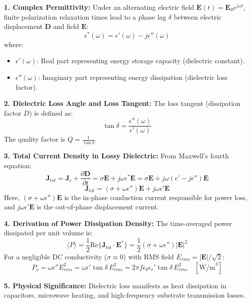 \begin{theorysol}
\textbf{1. Complex Permittivity:}
Under an alternating electric field $\mathbf{E}(t) = \mathbf{E}_0 e^{j\omega t}$, finite polarization relaxation times lead to a phase lag $\delta$ between electric displacement $\mathbf{D}$ and field $\mathbf{E}$:
\begin{equation}
\epsilon^*(\omega) = \epsilon'(\omega) - j\epsilon''(\omega)
\end{equation}
where:
\begin{itemize}
\item $\epsilon'(\omega)$: Real part representing energy storage capacity (dielectric constant).
\item $\epsilon''(\omega)$: Imaginary part representing energy dissipation (dielectric loss factor).
\end{itemize}

\textbf{2. Dielectric Loss Angle and Loss Tangent:}
The loss tangent (dissipation factor $D$) is defined as:
\begin{equation}
\tan \delta = \frac{\epsilon''(\omega)}{\epsilon'(\omega)}
\end{equation}
The quality factor is $Q = \frac{1}{\tan \delta}$.

\textbf{3. Total Current Density in Lossy Dielectric:}
From Maxwell's fourth equation:
\begin{equation}
\mathbf{J}_{tot} = \mathbf{J}_c + \frac{\partial \mathbf{D}}{\partial t} = \sigma \mathbf{E} + j\omega \epsilon^* \mathbf{E} = \sigma \mathbf{E} + j\omega(\epsilon' - j\epsilon'')\mathbf{E}
\end{equation}
\begin{equation}
\mathbf{J}_{tot} = (\sigma + \omega\epsilon'')\mathbf{E} + j\omega\epsilon'\mathbf{E}
\end{equation}
Here, $(\sigma + \omega\epsilon'')\mathbf{E}$ is the in-phase conduction current responsible for power loss, and $j\omega\epsilon'\mathbf{E}$ is the out-of-phase displacement current.

\textbf{4. Derivation of Power Dissipation Density:}
The time-averaged power dissipated per unit volume is:
\begin{equation}
\langle P \rangle = \frac{1}{2} \text{Re}\{\mathbf{J}_{tot} \cdot \mathbf{E}^*\} = \frac{1}{2} (\sigma + \omega\epsilon'') |\mathbf{E}|^2
\end{equation}
For a negligible DC conductivity ($\sigma \approx 0$) with RMS field $E_{rms} = |\mathbf{E}|/\sqrt{2}$:
\begin{equation}
P_v = \omega \epsilon'' E_{rms}^2 = \omega \epsilon' \tan\delta\, E_{rms}^2 = 2\pi f \epsilon_0 \epsilon_r' \tan\delta\, E_{rms}^2\quad [\text{W/m}^3]
\end{equation}

\textbf{5. Physical Significance:}
Dielectric loss manifests as heat dissipation in capacitors, microwave heating, and high-frequency substrate transmission losses.
\end{theorysol}
\vspace{4mm}

